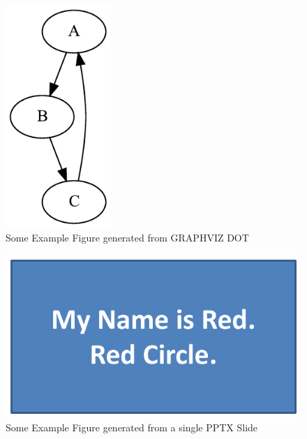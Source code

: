 \begin{figure}[htb]
\centering
\includegraphics[width=4cm]{figures/example}
\caption{Some Example Figure generated from GRAPHVIZ DOT}\label{fig:intro:example}
\end{figure}

\lipsum[14]

\begin{figure}[htb]
\centering
\includegraphics[width=\linewidth]{figures/example-pptx-figure}
\caption{Some Example Figure generated from a single PPTX Slide}\label{fig:intro:example2}
\end{figure}

\lipsum[15]